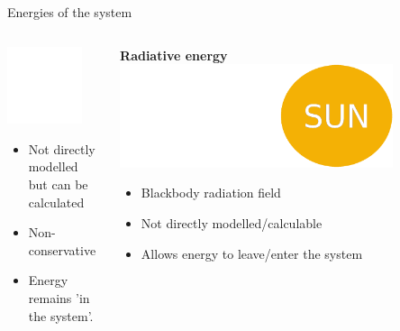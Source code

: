 \documentclass[10pt,aspectratio=169,usenames,dvipsnames]{beamer}
\begin{document}
\begin{frame}{Energies of the system}
\begin{columns}
\begin{column}{0.3\textwidth}
\includegraphics[width=0.8\textwidth]{2023StAndrewsAstro/Figures/ionenergy.png}
\begin{itemize}
    \item Not directly modelled but can be calculated
    \item Non-conservative 
    \item Energy remains 'in the system'.
\end{itemize}
\end{column}
\begin{column}{0.3\textwidth}
\centering
\textbf{Radiative energy}
\includegraphics[width=0.8\textwidth]{2023StAndrewsAstro/Figures/radiationenergy.png}
\begin{itemize}
    \item Blackbody radiation field
    \item Not directly modelled/calculable 
    \item Allows energy to leave/enter the system
\end{itemize}
\end{column}
\end{columns}
\end{frame}
\end{document}
